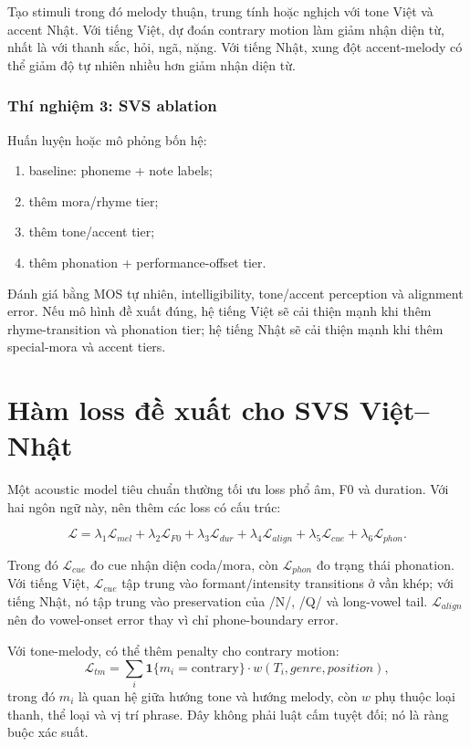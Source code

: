 \documentclass[12pt,a4paper]{article}
\begin{document}
Tạo stimuli trong đó melody thuận, trung tính hoặc nghịch với tone Việt và accent Nhật. Với tiếng Việt, dự đoán contrary motion làm giảm nhận diện từ, nhất là với thanh sắc, hỏi, ngã, nặng. Với tiếng Nhật, xung đột accent-melody có thể giảm độ tự nhiên nhiều hơn giảm nhận diện từ.

\subsubsection{Thí nghiệm 3: SVS ablation}

Huấn luyện hoặc mô phỏng bốn hệ:

\begin{enumerate}
  \item baseline: phoneme + note labels;
  \item thêm mora/rhyme tier;
  \item thêm tone/accent tier;
  \item thêm phonation + performance-offset tier.
\end{enumerate}

Đánh giá bằng MOS tự nhiên, intelligibility, tone/accent perception và alignment error. Nếu mô hình đề xuất đúng, hệ tiếng Việt sẽ cải thiện mạnh khi thêm rhyme-transition và phonation tier; hệ tiếng Nhật sẽ cải thiện mạnh khi thêm special-mora và accent tiers.

\section{Hàm loss đề xuất cho SVS Việt--Nhật}

Một acoustic model tiêu chuẩn thường tối ưu loss phổ âm, F0 và duration. Với hai ngôn ngữ này, nên thêm các loss có cấu trúc:

\[
\mathcal{L} = \lambda_1\mathcal{L}_{mel} + \lambda_2\mathcal{L}_{F0} + \lambda_3\mathcal{L}_{dur} + \lambda_4\mathcal{L}_{align} + \lambda_5\mathcal{L}_{cue} + \lambda_6\mathcal{L}_{phon}.
\]

Trong đó $\mathcal{L}_{cue}$ đo cue nhận diện coda/mora, còn $\mathcal{L}_{phon}$ đo trạng thái phonation. Với tiếng Việt, $\mathcal{L}_{cue}$ tập trung vào formant/intensity transitions ở vần khép; với tiếng Nhật, nó tập trung vào preservation của /N/, /Q/ và long-vowel tail. $\mathcal{L}_{align}$ nên đo vowel-onset error thay vì chỉ phone-boundary error.

Với tone-melody, có thể thêm penalty cho contrary motion:
\[
\mathcal{L}_{tm} = \sum_i \mathbf{1}\{m_i = \text{contrary}\}\cdot w(T_i, genre, position),
\]
trong đó $m_i$ là quan hệ giữa hướng tone và hướng melody, còn $w$ phụ thuộc loại thanh, thể loại và vị trí phrase. Đây không phải luật cấm tuyệt đối; nó là ràng buộc xác suất.
\end{document}
